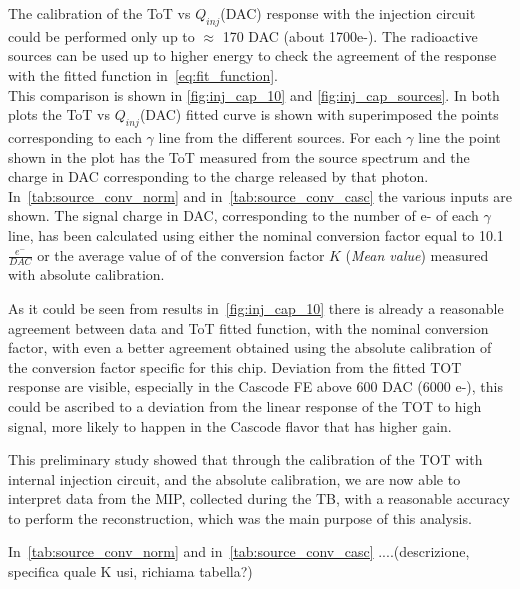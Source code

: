 The calibration of the ToT vs $Q_{inj}$(DAC) response with the injection circuit could be performed only up to $\approx$ 170 DAC (about 1700e-). The radioactive sources can be used up to higher energy to check the agreement of the response with the fitted function in~\autoref{eq:fit_function}.\\

This comparison is shown in \autoref{fig:inj_cap_10} and \autoref{fig:inj_cap_sources}. In both plots the ToT vs $Q_{inj}$(DAC) fitted curve is shown with superimposed the points corresponding to each $\gamma$ line from the different sources. 
For each $\gamma$ line the point shown in the plot has the ToT measured from the source spectrum and the charge in DAC corresponding to the charge released by that photon.  
In~\autoref{tab:source_conv_norm} and in~\autoref{tab:source_conv_casc} the various inputs are shown. 
The signal charge in DAC, corresponding to the number of e- of each $\gamma$ line, has been calculated using either the nominal conversion factor equal to 10.1 $\frac{e^{-}}{DAC}$ or the average value of of the conversion factor $K$ (\textit{Mean value}) measured with  absolute calibration. 

As it could be seen from results in~\autoref{fig:inj_cap_10} there is already a reasonable agreement between data and ToT fitted function, with the nominal conversion factor, with even a better agreement obtained using the absolute calibration of the conversion factor specific for this chip. 
Deviation from the fitted TOT response are visible, especially in the Cascode FE above 600 DAC (6000 e-), this could be ascribed to a deviation from the linear response of the TOT to high signal, more likely to happen in the Cascode flavor that has higher gain.

This preliminary study showed that through the calibration of the TOT with internal injection circuit, and the absolute calibration, we are now able to interpret data from the MIP, collected during the TB,  with a reasonable accuracy to perform the reconstruction, which was the main purpose of this analysis.



In~\autoref{tab:source_conv_norm} and in~\autoref{tab:source_conv_casc}   ....(descrizione, specifica quale K usi, richiama tabella?)

